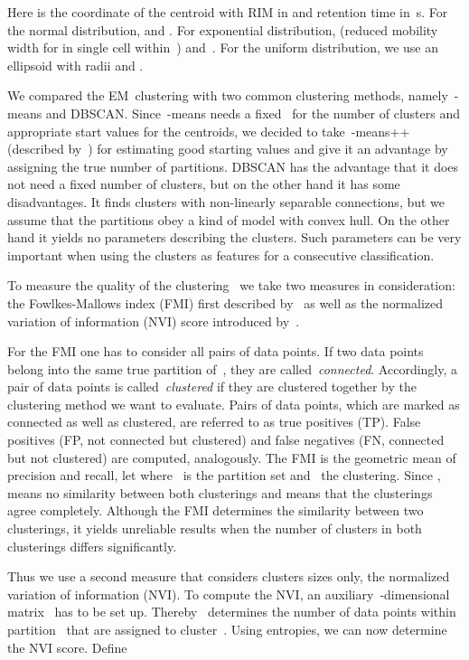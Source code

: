 \documentclass{article}
\begin{document}
Here  is the coordinate of the centroid with RIM in  and retention time in~s.
For the normal distribution,  and .
For exponential distribution,  (reduced mobility width for in single cell within~) and~.
For the uniform distribution, we use an ellipsoid with radii  and .

We compared the EM~clustering with two common clustering methods, namely~-means and DBSCAN.
Since~-means needs a fixed~ for the number of clusters and appropriate start values for the centroids, we decided to take~-means++ (described by~\cite{arthur/etal/2007}) for estimating good starting values and give it an advantage by assigning the true number of partitions.
DBSCAN has the advantage that it does not need a fixed number of clusters, but on the other hand it has some disadvantages.
It finds clusters with non-linearly separable connections, but we assume that the partitions obey a kind of model with convex hull.
On the other hand it yields no parameters describing the clusters.
Such parameters can be very important when using the clusters as features for a consecutive classification.

To measure the quality of the clustering~ we take two measures in consideration: the Fowlkes-Mallows index (FMI) first described by~\cite{fowkles/etal/1983} as well as the normalized variation of information (NVI) score introduced by~\cite{reichart/etal/2009}.


For the FMI one has to consider all pairs of data points.
If two data points belong into the same true partition of~, they are called~\emph{connected}.
Accordingly, a pair of data points is called~\emph{clustered} if they are clustered together by the clustering method we want to evaluate.
Pairs of data points, which are marked as connected as well as clustered, are referred to as true positives (TP).
False positives (FP, not connected but clustered) and false negatives (FN, connected but not clustered) are computed, analogously.
The FMI is the geometric mean of precision and recall, let \hbox{} where~ is the partition set and~ the clustering.
Since \hbox{},  means no similarity between both clusterings and  means that the clusterings agree completely.
Although the FMI determines the similarity between two clusterings, it yields unreliable results when the number of clusters in both clusterings differs significantly.

Thus we use a second measure that considers clusters sizes only, the normalized variation of information (NVI).
To compute the NVI, an auxiliary~-dimensional matrix~ has to be set up.
Thereby~ determines the number of data points within partition~ that are assigned to cluster~.
Using entropies, we can now determine the NVI score.
Define
\end{document}
